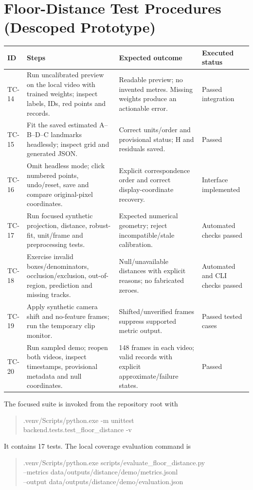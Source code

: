 \section{Floor-Distance Test Procedures (Descoped Prototype)}
\begin{longtable}{P{0.09\textwidth}P{0.35\textwidth}P{0.30\textwidth}P{0.14\textwidth}}
\toprule
ID & Steps & Expected outcome & Executed status\\
\midrule
\endhead
TC-14 & Run uncalibrated preview on the local video with trained weights; inspect labels, IDs, red points and records. & Readable preview; no invented metres. Missing weights produce an actionable error. & Passed integration\\
TC-15 & Fit the saved estimated A--B--D--C landmarks headlessly; inspect grid and generated JSON. & Correct units/order and provisional status; H and residuals saved. & Passed\\
TC-16 & Omit headless mode; click numbered points, undo/reset, save and compare original-pixel coordinates. & Explicit correspondence order and correct display-coordinate recovery. & Interface implemented\\
TC-17 & Run focused synthetic projection, distance, robust-fit, unit/frame and preprocessing tests. & Expected numerical geometry; reject incompatible/stale calibration. & Automated checks passed\\
TC-18 & Exercise invalid boxes/denominators, occlusion/exclusion, out-of-region, prediction and missing tracks. & Null/unavailable distances with explicit reasons; no fabricated zeroes. & Automated and CLI checks passed\\
TC-19 & Apply synthetic camera shift and no-feature frames; run the temporary clip monitor. & Shifted/unverified frames suppress supported metric output. & Passed tested cases\\
TC-20 & Run sampled demo; reopen both videos, inspect timestamps, provisional metadata and null coordinates. & 148 frames in each video; valid records with explicit approximate/failure states. & Passed\\
\bottomrule
\end{longtable}
The focused suite is invoked from the repository root with
\begin{quote}\small\ttfamily
.venv/Scripts/python.exe -m unittest\\
\hspace*{1em}backend.tests.test\_floor\_distance -v
\end{quote}
It contains 17 tests. The local coverage evaluation command is
\begin{quote}\small\ttfamily
.venv/Scripts/python.exe scripts/evaluate\_floor\_distance.py\\
\hspace*{1em}--metrics data/outputs/distance/demo/metrics.jsonl\\
\hspace*{1em}--output data/outputs/distance/demo/evaluation.json
\end{quote}

